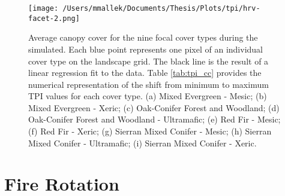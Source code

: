 \begin{figure}[!htbp]
\centering
\texttt{[image: /Users/mmallek/Documents/Thesis/Plots/tpi/hrv-facet-2.png]}
\caption{Average canopy cover for the nine focal cover types during the simulated. Each blue point represents one pixel of an individual cover type on the landscape grid. The black line is the result of a linear regression fit to the data. Table \ref{tab:tpi_cc} provides the numerical representation of the shift from minimum to maximum TPI values for each cover type. (a) Mixed Evergreen - Mesic; (b) Mixed Evergreen - Xeric; (c) Oak-Conifer Forest and Woodland; (d) Oak-Conifer Forest and Woodland - Ultramafic; (e) Red Fir - Mesic; (f) Red Fir - Xeric; (g) Sierran Mixed Conifer - Mesic; (h) Sierran Mixed Conifer - Ultramafic; (i) Sierran Mixed Conifer - Xeric.} 
\label{fig:tpi_cc}
\end{figure}

\clearpage









\section{Fire Rotation}

